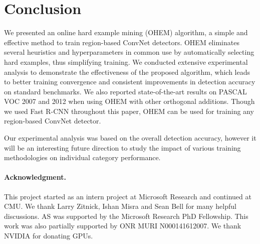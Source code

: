 \documentclass[10pt,twocolumn,letterpaper]{article}
\begin{document}
\vspace{-0.05in}
\section{Conclusion}
\vspace{-0.03in}
We presented an online hard example mining (OHEM) algorithm, a simple and effective method to train region-based ConvNet detectors. OHEM eliminates several heuristics and hyperparameters in common use by automatically selecting hard examples, thus simplifying training. We conducted extensive experimental analysis to demonstrate the effectiveness of the proposed algorithm, which leads to better training convergence and consistent improvements in detection accuracy on standard benchmarks. We also reported state-of-the-art results on PASCAL VOC 2007 and 2012 when using OHEM with other orthogonal additions. Though we used Fast R-CNN throughout this paper, OHEM can be used for training any region-based ConvNet detector.

Our experimental analysis was based on the overall detection accuracy, however it will be an interesting future direction to study the impact of various training methodologies on individual category performance.


\vspace{-0.1in}
\paragraph{Acknowledgment.}
This project started as an intern project at Microsoft Research and continued at CMU. We thank Larry Zitnick, Ishan Misra and Sean Bell for many helpful discussions. AS was supported by the Microsoft Research PhD Fellowship. This work was also partially supported by ONR MURI N000141612007. We thank NVIDIA for donating GPUs.




\end{document}

